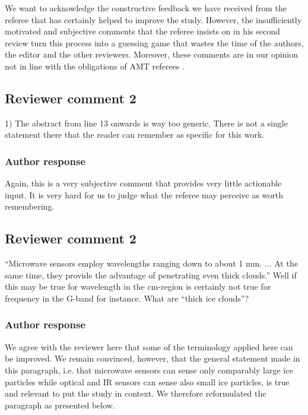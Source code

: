 \begin{description}
We want to acknowledge the constructive feedback we have received from the
referee that has certainly helped to improve the study. However, the
insufficiently motivated and subjective comments that the referee insists on in
his second review turn this process into a guessing game that wastes the time of
the authors, the editor and the other reviewers. Moreover, these comments are in
our opinion not in line with the obligations of AMT referees
\citep{amt_obligations}.

\subsection*{Reviewer comment 2}

1) The abstract from line 13 onwards is way too generic. There is not a single statement there that
the reader can remember as specific for this work. 

\subsubsection*{Author response}

Again, this is a very subjective comment that provides very little actionable
input. It is very hard for us to judge what the referee may perceive as worth
remembering.

\subsection*{Reviewer comment 2}

``Microwave sensors employ wavelengths ranging down to about 1 mm. ... At the
same time, they provide the advantage of penetrating even thick clouds.'' Well
if this may be true for wavelength in the cm-region is certainly not true for
frequency in the G-band for instance. What are ``thick ice clouds''?

\subsubsection*{Author response}

We agree with the reviewer here that some of the terminology applied here can be
improved. We remain convinced, however, that the general statement made in this
paragraph, i.e. that microwave sensors can sense only comparably large ice
particles while optical and IR sensors can sense also small ice particles, is
true and relevant to put the study in context. We therefore reformulated the
paragraph as presented below.


\end{description}
